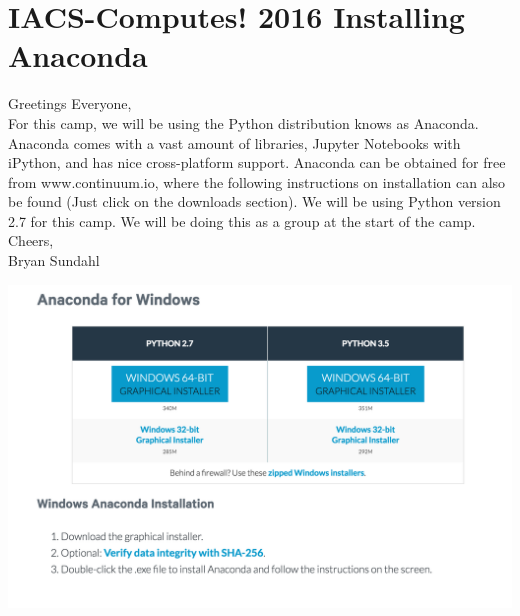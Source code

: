 \documentclass[]{article}
\begin{document}
\section*{IACS-Computes! 2016 Installing Anaconda}
Greetings Everyone, \\

For this camp, we will be using the Python distribution knows as Anaconda. Anaconda comes with a vast amount of libraries, Jupyter Notebooks with iPython, and has nice cross-platform support. Anaconda can be obtained for free from www.continuum.io, where the following instructions on installation can also be found (Just click on the downloads section). We will be using Python version 2.7 for this camp. We will be doing this as a group at the start of the camp.\\

Cheers, \\
 Bryan Sundahl
\vspace{1in}

\begin{centering}
    \centerline{\includegraphics[scale=0.5]{windows.png}}
\end{centering}
\end{document}
